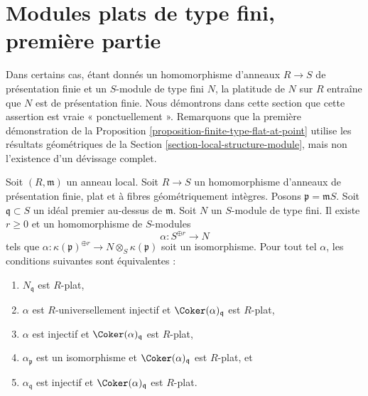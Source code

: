 












\section{Modules plats de type fini, première partie}
\label{section-finite-type-flat-I}

\noindent
Dans certains cas, étant donnés un homomorphisme d'anneaux $R \to S$ de présentation finie et
un $S$-module de type fini $N$, la platitude de $N$ sur $R$ entraîne que $N$
est de présentation finie. Nous démontrons dans cette section que cette assertion est vraie
« ponctuellement ». Remarquons que la première démonstration de la
Proposition \ref{proposition-finite-type-flat-at-point}
utilise les résultats géométriques de la
Section \ref{section-local-structure-module},
mais non l'existence d'un d\'evissage complet.

\begin{lemma}
\label{lemma-induction-step}
Soit $(R, \mathfrak m)$ un anneau local. Soit $R \to S$ un homomorphisme d'anneaux de présentation finie,
plat et à fibres géométriquement intègres. Posons
$\mathfrak p = \mathfrak mS$. Soit $\mathfrak q \subset S$ un idéal premier
au-dessus de $\mathfrak m$. Soit $N$ un $S$-module de type fini.
Il existe $r \geq 0$ et un homomorphisme de $S$-modules
$$
\alpha : S^{\oplus r} \longrightarrow N
$$
tels que
$\alpha : \kappa(\mathfrak p)^{\oplus r} \to N \otimes_S \kappa(\mathfrak p)$
soit un isomorphisme. Pour tout tel $\alpha$, les conditions suivantes sont équivalentes :
\begin{enumerate}
\item $N_{\mathfrak q}$ est $R$-plat,
\item $\alpha$ est $R$-universellement injectif et
$\Coker(\alpha)_{\mathfrak q}$ est $R$-plat,
\item $\alpha$ est injectif et
$\Coker(\alpha)_{\mathfrak q}$ est $R$-plat,
\item $\alpha_{\mathfrak p}$ est un isomorphisme et
$\Coker(\alpha)_{\mathfrak q}$ est $R$-plat, et
\item $\alpha_{\mathfrak q}$ est injectif et
$\Coker(\alpha)_{\mathfrak q}$ est $R$-plat.
\end{enumerate}
\end{lemma}

